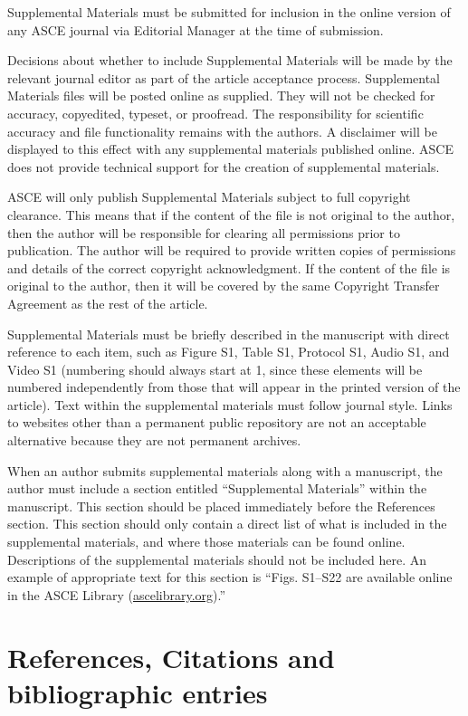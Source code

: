 \documentclass[Journal,letterpaper,NoLineNumbers]{ascelike-new}
\begin{document}
Supplemental Materials must be submitted for inclusion in the online version of any ASCE journal via Editorial Manager at the time of submission.

Decisions about whether to include Supplemental Materials will be made by the relevant journal editor as part of the article acceptance process. Supplemental Materials files will be posted online as supplied. They will not be checked for accuracy, copyedited, typeset, or proofread. The responsibility for scientific accuracy and file functionality remains with the authors. A disclaimer will be displayed to this effect with any supplemental materials published online. ASCE does not provide technical support for the creation of supplemental materials.

ASCE will only publish Supplemental Materials subject to full copyright clearance. This means that if the content of the file is not original to the author, then the author will be responsible for clearing all permissions prior to publication. The author will be required to provide written copies of permissions and details of the correct copyright acknowledgment. If the content of the file is original to the author, then it will be covered by the same Copyright Transfer Agreement as the rest of the article.

Supplemental Materials must be briefly described in the manuscript with direct reference to each item, such as Figure S1, Table S1, Protocol S1, Audio S1, and Video S1 (numbering should always start at 1, since these elements will be numbered independently from those that will appear in the printed version of the article). Text within the supplemental materials must follow journal style. Links to websites other than a permanent public repository are not an acceptable alternative because they are not permanent archives.

When an author submits supplemental materials along with a manuscript, the author must include a section entitled ``Supplemental Materials'' within the manuscript. This section should be placed immediately before the References section. This section should only contain a direct list of what is included in the supplemental materials, and where those materials can be found online. Descriptions of the supplemental materials should not be included here. An example of appropriate text for this section is ``Figs. S1–S22 are available online in the ASCE Library (\href{http://ascelibrary.org/}{ascelibrary.org}).''

\section{References, Citations and bibliographic entries}
\end{document}
